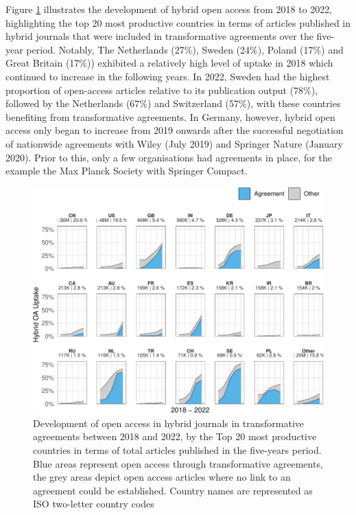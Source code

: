 \documentclass[a4paper,man,floatsintext,longtable,noextraspace,12pt]{apa6}
\begin{document}
Figure \ref{fig:country_top_20_plot} illustrates the development of
hybrid open access from 2018 to 2022, highlighting the top 20 most
productive countries in terms of articles published in hybrid journals
that were included in transformative agreements over the five-year
period. Notably, The Netherlands (27\%), Sweden (24\%), Poland (17\%)
and Great Britain (17\%)) exhibited a relatively high level of uptake in
2018 which continued to increase in the following years. In 2022, Sweden
had the highest proportion of open-access articles relative to its
publication output (78\%), followed by the Netherlands (67\%) and
Switzerland (57\%), with these countries benefiting from transformative
agreements. In Germany, however, hybrid open access only began to
increase from 2019 onwards after the successful negotiation of
nationwide agreements with Wiley (July 2019) and Springer Nature
(January 2020). Prior to this, only a few organisations had agreements
in place, for the example the Max Planck Society with Springer Compact.

\begin{figure}[ht!]

{\centering \includegraphics[width=0.99\linewidth,]{fig/country_top_20_plot-1} 

}

\caption{Development of open access in hybrid journals in transformative agreements between 2018 and 2022, by the Top 20 most productive countries in terms of total articles published in the five-years period. Blue areas represent open access through transformative agreements, the grey areas depict open access articles where no link to an agreement could be established. Country names are represented as ISO two-letter country codes}\label{fig:country_top_20_plot}
\end{figure}
\end{document}

